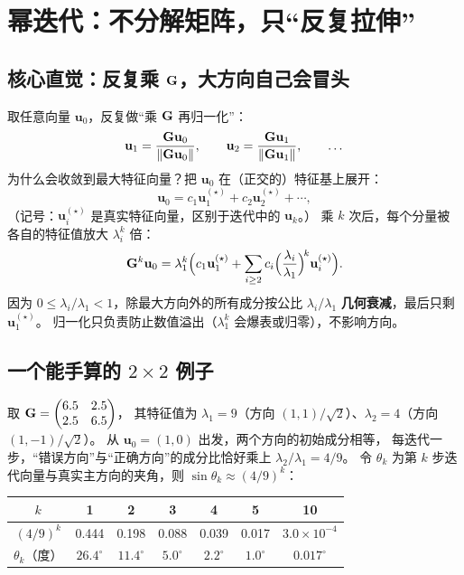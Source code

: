 \section{幂迭代：不分解矩阵，只“反复拉伸”}

\subsection{核心直觉：反复乘 $\mathbf{G}$，大方向自己会冒头}

取任意向量 $\mathbf{u}_0$，反复做“乘 $\mathbf{G}$ 再归一化”：
\[
\mathbf{u}_1=\frac{\mathbf{G}\mathbf{u}_0}{\left\lVert \mathbf{G}\mathbf{u}_0 \right\rVert},\qquad
\mathbf{u}_2=\frac{\mathbf{G}\mathbf{u}_1}{\left\lVert \mathbf{G}\mathbf{u}_1 \right\rVert},\qquad\dots
\]
为什么会收敛到最大特征向量？把 $\mathbf{u}_0$ 在（正交的）特征基上展开：
\[
\mathbf{u}_0=c_1\mathbf{u}_1^{(\star)}+c_2\mathbf{u}_2^{(\star)}+\cdots ,
\]
（记号：$\mathbf{u}_i^{(\star)}$ 是真实特征向量，区别于迭代中的 $\mathbf{u}_k$。）
乘 $k$ 次后，每个分量被各自的特征值放大 $\lambda_i^k$ 倍：
\[
\mathbf{G}^k\mathbf{u}_0
=\lambda_1^k\Big(c_1\mathbf{u}_1^{(\star)}
+\sum_{i\ge 2}c_i\Big(\frac{\lambda_i}{\lambda_1}\Big)^{\!k}\mathbf{u}_i^{(\star)}\Big).
\]
因为 $0\le\lambda_i/\lambda_1<1$，除最大方向外的所有成分按公比 $\lambda_i/\lambda_1$
\textbf{几何衰减}，最后只剩 $\mathbf{u}_1^{(\star)}$。
归一化只负责防止数值溢出（$\lambda_1^k$ 会爆表或归零），不影响方向。

\subsection{一个能手算的 $2\times 2$ 例子}

取 $\mathbf{G}=\begin{pmatrix}6.5&2.5\\2.5&6.5\end{pmatrix}$，
其特征值为 $\lambda_1=9$（方向 $(1,1)/\sqrt2$）、$\lambda_2=4$（方向 $(1,-1)/\sqrt2$）。
从 $\mathbf{u}_0=(1,0)$ 出发，两个方向的初始成分相等，
每迭代一步，“错误方向”与“正确方向”的成分比恰好乘上 $\lambda_2/\lambda_1=4/9$。
令 $\theta_k$ 为第 $k$ 步迭代向量与真实主方向的夹角，则 $\sin\theta_k\approx(4/9)^k$：

\begin{center}
\begin{tabular}{ccccccc}
\toprule
$k$ & 1 & 2 & 3 & 4 & 5 & 10\\
\midrule
$(4/9)^k$ & 0.444 & 0.198 & 0.088 & 0.039 & 0.017 & $3.0\times10^{-4}$\\
$\theta_k$（度）& $26.4^\circ$ & $11.4^\circ$ & $5.0^\circ$ & $2.2^\circ$ & $1.0^\circ$ & $0.017^\circ$\\
\bottomrule
\end{tabular}
\end{center}

